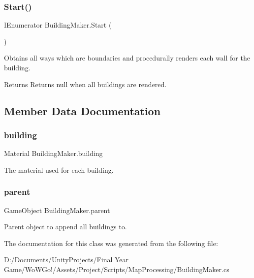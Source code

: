 \subsubsection{\texorpdfstring{Start()}{Start()}}
{\footnotesize\ttfamily I\+Enumerator Building\+Maker.\+Start (\begin{DoxyParamCaption}{ }\end{DoxyParamCaption})\hspace{0.3cm}{\ttfamily [private]}}



Obtains all ways which are boundaries and procedurally renders each wall for the building. 

\begin{DoxyReturn}{Returns}
Returns null when all buildings are rendered.
\end{DoxyReturn}


\subsection{Member Data Documentation}
\mbox{\label{class_building_maker_a1de67cfa4c1a4f25ad07d8930925bd09}} 
\subsubsection{\texorpdfstring{building}{building}}
{\footnotesize\ttfamily Material Building\+Maker.\+building}



The material used for each building. 

\mbox{\label{class_building_maker_a9a9535053ed24cf75681b437970e9752}} 
\subsubsection{\texorpdfstring{parent}{parent}}
{\footnotesize\ttfamily Game\+Object Building\+Maker.\+parent}



Parent object to append all buildings to. 



The documentation for this class was generated from the following file\+:\begin{DoxyCompactItemize}
\item 
D\+:/\+Documents/\+Unity\+Projects/\+Final Year Game/\+Wo\+W\+Go!/\+Assets/\+Project/\+Scripts/\+Map\+Processing/Building\+Maker.\+cs\end{DoxyCompactItemize}
